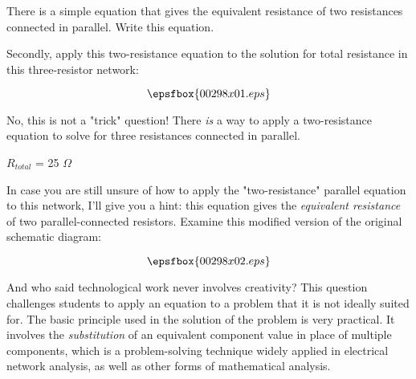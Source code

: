 


There is a simple equation that gives the equivalent resistance of two resistances connected in parallel.  Write this equation.

Secondly, apply this two-resistance equation to the solution for total resistance in this three-resistor network:

$$\epsfbox{00298x01.eps}$$

No, this is not a "trick" question!  There {\it is} a way to apply a two-resistance equation to solve for three resistances connected in parallel.







$R_{total}$ = 25 $\Omega$

\vskip 10pt

In case you are still unsure of how to apply the "two-resistance" parallel equation to this network, I'll give you a hint: this equation gives the {\it equivalent resistance} of two parallel-connected resistors.  Examine this modified version of the original schematic diagram:

$$\epsfbox{00298x02.eps}$$







And who said technological work never involves creativity?  This question challenges students to apply an equation to a problem that it is not ideally suited for.  The basic principle used in the solution of the problem is very practical.  It involves the {\it substitution} of an equivalent component value in place of multiple components, which is a problem-solving technique widely applied in electrical network analysis, as well as other forms of mathematical analysis.




